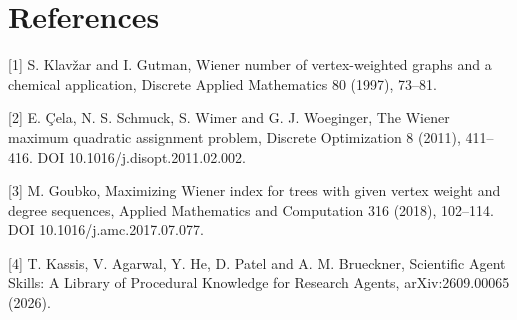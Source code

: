 \documentclass[11pt]{article}
\begin{document}
\section*{References}
[1] S. Klav\v{z}ar and I. Gutman, Wiener number of vertex-weighted graphs and a chemical application, Discrete Applied Mathematics 80 (1997), 73--81.

[2] E. \c{C}ela, N. S. Schmuck, S. Wimer and G. J. Woeginger, The Wiener maximum quadratic assignment problem, Discrete Optimization 8 (2011), 411--416. DOI 10.1016/j.disopt.2011.02.002.

[3] M. Goubko, Maximizing Wiener index for trees with given vertex weight and degree sequences, Applied Mathematics and Computation 316 (2018), 102--114. DOI 10.1016/j.amc.2017.07.077.

[4] T. Kassis, V. Agarwal, Y. He, D. Patel and A. M. Brueckner, Scientific Agent Skills: A Library of Procedural Knowledge for Research Agents, arXiv:2609.00065 (2026).
\end{document}
